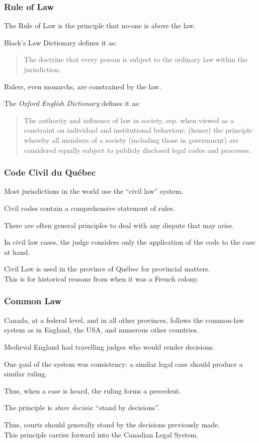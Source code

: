 \begin{frame}
\frametitle{Rule of Law}

The \alert{Rule of Law} is the principle that no-one is above the law.

Black's Law Dictionary defines it as:
\begin{quote}
The doctrine that every person is subject to the ordinary law within the jurisdiction.
\end{quote}

Rulers, even monarchs, are constrained by the law. 

The \textit{Oxford English Dictionary} defines it as:

\begin{quote}
The authority and influence of law in society, esp. when viewed as a constraint on individual and institutional behaviour; (hence) the principle whereby all members of a society (including those in government) are considered equally subject to publicly disclosed legal codes and processes.
\end{quote}

\end{frame}



\begin{frame}
\frametitle{Code Civil du Qu\'ebec}

Most jurisdictions in the world use the ``civil law'' system.

Civil codes contain a comprehensive statement of rules. 

There are often general principles to deal with any dispute that may arise.

In civil law cases, the judge considers only the application of the code to the case at hand.

Civil Law is used in the province of Qu\'ebec for provincial matters.\\
\quad This is for historical reasons from when it was a French colony.

\end{frame}



\begin{frame}
\frametitle{Common Law}

Canada, at a federal level, and in all other provinces, follows the common-law system as in England, the USA, and numerous other countries.

Medieval England had travelling judges who would render decisions.

One goal of the system was consistency: a similar legal case should produce a similar ruling.

Thus, when a case is heard, the ruling forms a \alert{precedent}.

The principle is \textit{stare decisis}: ``stand by decisions''.

Thus, courts should generally stand by the decisions previously made.\\
\quad This principle carries forward into the Canadian Legal System.

\end{frame}



